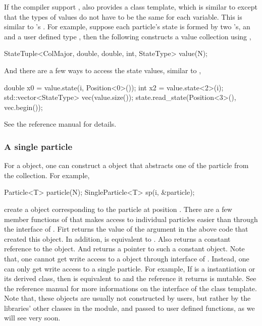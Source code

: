 If the compiler support \cppoo{} , \vsmc also provides a
 class template, which is similar to
 except that the types of values do not have to be the
same for each variable. This is similar to \rlang's .
For example, suppose each particle's state is formed by two
's, an  and a user defined type
, then the following constructs a value collection using
,
\begin{cppcode}
StateTuple<ColMajor, double, double, int, StateType> value(N);
\end{cppcode}
And there are a few ways to access the state values, similar to
,
\begin{cppcode}
double x0 = value.state(i, Position<0>());
int x2 = value.state<2>(i);
std::vector<StateType> vec(value.size());
state.read_state(Position<3>(), vec.begin());
\end{cppcode}
See the reference manual for details.

\subsubsection{A single particle}
\label{ssub:A single particle}

For a  object, one can construct a
 object that abstracts one of the particle from
the collection. For example,
\begin{cppcode}
Particle<T> particle(N);
SingleParticle<T> sp(i, &particle);
\end{cppcode}
create a  object corresponding to the particle at
position . There are a few member functions of
 that makes access to individual particles easier
than through the interface of . Firt
 returns the value of the argument  in the
above code that created this  object. In
addition,  is equivalent to .
Also  returns a constant reference to the
 object. And  returns a
pointer to such a constant  object. Note that, one
cannot get write access to a  object through interface
of . Instead, one can only get write access to a
single particle. For example, If  is a 
instantiation or its derived class, then  is
equivalent to  and the reference it
returns is mutable. See the reference manual for more informations on the
interface of the  class template. Note that, these
 objects are usually not constructed by users,
but rather by the libraries' other classes in the \smp module, and passed to
user defined functions, as we will see very soon.

